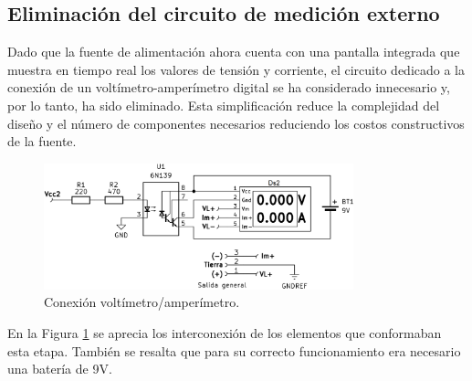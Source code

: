 \subsection{Eliminación del circuito de medición externo}
Dado que la fuente de alimentación ahora cuenta con una pantalla integrada que muestra en tiempo real los valores de tensión y corriente, el circuito dedicado a la conexión de un voltímetro-amperímetro digital se ha considerado innecesario y, por lo tanto, ha sido eliminado. Esta simplificación reduce la complejidad del diseño y el número de componentes necesarios reduciendo los costos constructivos de la fuente.
\begin{figure}[H]
    \centering
    \includegraphics[width=0.8\textwidth]{./imagenes/voltimetro_amperimetro.png}
    \caption{Conexión voltímetro/amperímetro.}
    \label{F:voltimetro_amperimetro}
\end{figure}
En la Figura \ref{F:voltimetro_amperimetro} se aprecia los interconexión de los elementos que conformaban esta etapa. También se resalta que para su correcto funcionamiento era necesario una batería de 9V.

